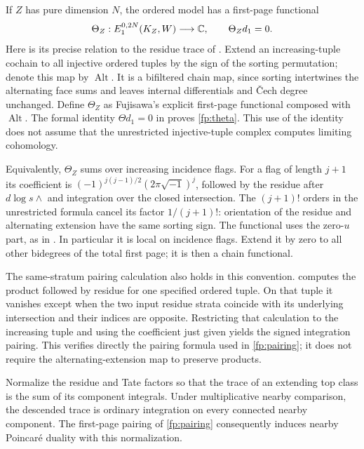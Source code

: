 If $Z$ has pure dimension $N$, the ordered model has a first-page functional
\begin{equation}\label{fp:theta}
 \Theta_Z:E_1^{0,2N}(K_Z,W)\longrightarrow\mathbb C,
 \qquad \Theta_Zd_1=0.
\end{equation}
Here is its precise relation to the residue trace of
\cite[Section~7]{Fujisawa2014}.  Extend an increasing-tuple cochain to all
injective ordered tuples by the sign of the sorting permutation; denote this
map by $\operatorname{Alt}$.  It is a bifiltered chain map, since sorting
intertwines the alternating face sums and leaves internal differentials and
\v{C}ech degree unchanged.  Define $\Theta_Z$ as Fujisawa's explicit
first-page functional composed with $\operatorname{Alt}$.  The formal identity
$\Theta d_1=0$ in \cite[Proposition~7.9]{Fujisawa2014} proves
\eqref{fp:theta}.  This use of the identity does not assume that the
unrestricted injective-tuple complex computes limiting cohomology.

Equivalently, $\Theta_Z$ sums over increasing incidence flags.  For a flag of
length $j+1$ its coefficient is
$(-1)^{j(j-1)/2}(2\pi\sqrt{-1})^j$, followed by the residue after
$d\log s\wedge$ and integration over the closed intersection.  The
$(j+1)!$ orders in the unrestricted formula cancel its factor $1/(j+1)!$:
orientation of the residue and alternating extension have the same sorting
sign.  The functional uses the zero-$u$ part, as in
\cite[Equation~(7.8.1)]{Fujisawa2014}.  In particular it is local on incidence
flags.  Extend it by zero to all other bidegrees of the total first page; it
is then a chain functional.

The same-stratum pairing calculation also holds in this convention.
\cite[Lemma~6.13]{Fujisawa2014} computes the product followed by residue for
one specified ordered tuple.  On that tuple it vanishes except when the two
input residue strata coincide with its underlying intersection and their
indices are opposite.  Restricting that calculation to the increasing tuple
and using the coefficient just given yields the signed integration pairing.
This verifies directly the pairing formula used in \cref{fp:pairing}; it does
not require the alternating-extension map to preserve products.

\begin{lemma}\label{fp:trace-normalization}
Normalize the residue and Tate factors so that the trace of an extending top
class is the sum of its component integrals.  Under multiplicative nearby
comparison, the descended trace is ordinary integration on every connected
nearby component.  The first-page pairing of \cref{fp:pairing} consequently
induces nearby Poincar\'e duality with this normalization.
\end{lemma}

